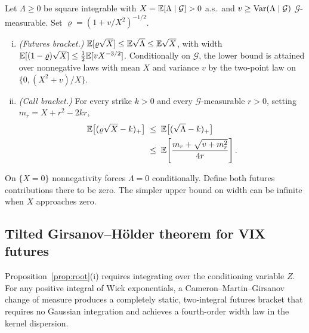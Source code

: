 \begin{proposition}\label{prop:root}
Let $\Lambda\ge0$ be square integrable with $X=\mathbb{E}[\Lambda\mid\mathcal{G}]>0$ a.s.\ and
$v\ge\operatorname{Var}(\Lambda\mid\mathcal{G})$ $\mathcal{G}$-measurable. Set $\varrho=(1+v/X^2)^{-1/2}$.
\begin{enumerate}[(i)]
\item \emph{(Futures bracket.)} $\mathbb{E}[\varrho\sqrt{X}]\le\mathbb{E}\sqrt{\Lambda}\le\mathbb{E}\sqrt{X}$, with width
  $\mathbb{E}[(1-\varrho)\sqrt{X}]\le\tfrac12\mathbb{E}[vX^{-3/2}]$. Conditionally on $\mathcal{G}$, the lower bound is
  attained over nonnegative laws with mean $X$ and variance $v$ by the two-point law on $\{0,(X^2+v)/X\}$.
\item \emph{(Call bracket.)} For every strike $k>0$ and every $\mathcal{G}$-measurable $r>0$, setting
  $m_r=X+r^2-2kr$,
  \begin{equation}\label{eq:root_call}
  \begin{split}
    \mathbb{E}\big[(\varrho\sqrt{X}-k)_+\big]&\;\le\;\mathbb{E}\big[(\sqrt{\Lambda}-k)_+\big]\\
    &\;\le\;\mathbb{E}\!\left[\frac{m_r+\sqrt{v+m_r^2}}{4r}\right].
  \end{split}
  \end{equation}
\end{enumerate}
\end{proposition}
On $\{X=0\}$ nonnegativity forces $\Lambda=0$ conditionally. Define both futures contributions
there to be zero. The simpler upper bound on width can be infinite when $X$ approaches zero.

\subsection{Tilted Girsanov--H\"older theorem for VIX futures}\label{sec:tilted}
Proposition~\ref{prop:root}(i) requires integrating over the conditioning variable $Z$. For any positive
integral of Wick exponentials, a Cameron--Martin--Girsanov change of measure produces a completely
static, two-integral futures bracket that requires no Gaussian integration and achieves a fourth-order
width law in the kernel dispersion.

